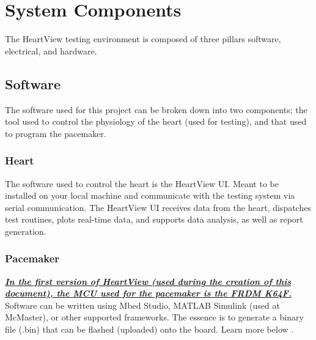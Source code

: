 \documentclass[11pt,fleqn]{book} %
\begin{document}
\section{System Components}

The HeartView testing environment is composed of three pillars software, electrical, and hardware. 


\subsection{Software}

The software used for this project can be broken down into two components; the tool used to control the physiology of the heart (used for testing), and that used to program the pacemaker.


\subsubsection{Heart}

The software used to control the heart is the HeartView UI. Meant to be installed on your local machine and communicate with the testing system via serial communication. The HeartView UI receives data from the heart, dispatches test routines, plots real-time data, and supports data analysis, as well as report generation.


\subsubsection{Pacemaker}

\underline{\textit{\textbf{In the first version of HeartView (used during the creation of this document), the \ac{MCU} used for the pacemaker is the FRDM K64F.}}} Software can be written using Mbed Studio, MATLAB Simulink (used at McMaster), or other supported frameworks. The essence is to generate a binary file (.bin) that can be flashed (uploaded) onto the board. Learn more below .

\end{document}
